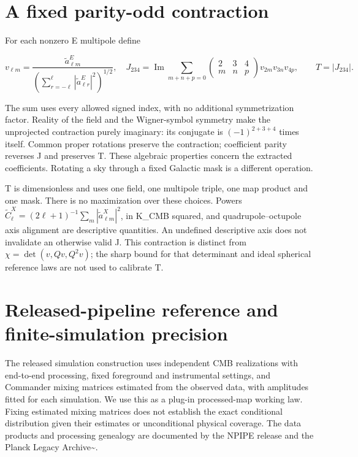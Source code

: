 \documentclass[aps,prd,reprint,onecolumn,nofootinbib]{revtex4-2}
\begin{document}
\hypertarget{a-fixed-parity-odd-contraction}{%
\section{A fixed parity-odd
contraction}\label{a-fixed-parity-odd-contraction}}

For each nonzero E multipole define

\[
 v_{\ell m}=\frac{\widetilde a^E_{\ell m}}
 {\left(\sum_{r=-\ell}^{\ell}|\widetilde a^E_{\ell r}|^2\right)^{1/2}},
 \quad
 J_{234}=\operatorname{Im}\sum_{m+n+p=0}
 \begin{pmatrix}2&3&4\\m&n&p\end{pmatrix}
 v_{2m}v_{3n}v_{4p},\qquad T=|J_{234}|.
\]

The sum uses every allowed signed index, with no additional
symmetrization factor. Reality of the field and the Wigner-symbol
symmetry make the unprojected contraction purely imaginary: its
conjugate is \((-1)^{2+3+4}\) times itself. Common proper rotations
preserve the contraction; coefficient parity reverses J and preserves T.
These algebraic properties concern the extracted coefficients. Rotating
a sky through a fixed Galactic mask is a different operation.

T is dimensionless and uses one field, one multipole triple, one map
product and one mask. There is no maximization over these choices.
Powers
\(\widetilde C_\ell^X=(2\ell+1)^{-1}\sum_m|\widetilde a^X_{\ell m}|^2\),
in K\_CMB squared, and quadrupole--octupole axis alignment are
descriptive quantities. An undefined descriptive axis does not
invalidate an otherwise valid J. This contraction is distinct from
\(\chi=\det(v,Qv,Q^2v)\); the sharp bound for that determinant and ideal
spherical reference laws are not used to calibrate T.

\hypertarget{released-pipeline-reference-and-finite-simulation-precision}{%
\section{Released-pipeline reference and finite-simulation
precision}\label{released-pipeline-reference-and-finite-simulation-precision}}

The released simulation construction uses independent CMB realizations
with end-to-end processing, fixed foreground and instrumental settings,
and Commander mixing matrices estimated from the observed data, with
amplitudes fitted for each simulation. We use this as a plug-in
processed-map working law. Fixing estimated mixing matrices does not
establish the exact conditional distribution given their estimates or
unconditional physical coverage. The data products and processing
genealogy are documented by the NPIPE release and the Planck Legacy
Archive\textasciitilde{}\cite{NPIPE2020,ESA_SIMULATION,PLA_PRODUCTS}.
\end{document}

